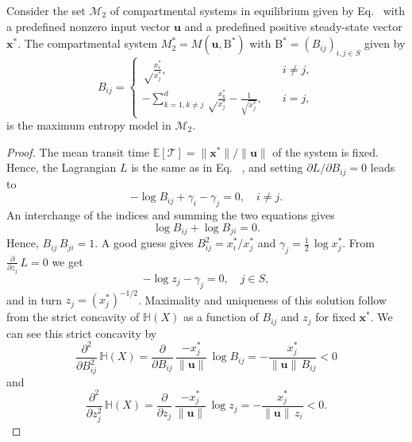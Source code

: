 \documentclass[smallextended]{svjour3}
\makeatletter
\renewcommand*{\eqref}[1]{%
  \hyperref[{#1}]{\textup{\tagform@{\ref*{#1}}}}%
}
\renewcommand{\tens}[1]{\mathrm{#1}}
\renewcommand{\vec}[1]{\mathbf{#1}}
\newcommand{\E}{\mathbb{E}}
\newcommand{\TT}{\mathcal{T}}
\renewcommand{\H}{\mathbb{H}}
\newcommand{\suml}{\sum\limits}
\newcommand{\pderiv}[1]{\frac{\partial}{\partial #1}}
\newcommand{\vnorms}[1]{\|#1\|}
\makeatother
\begin{document}
	\begin{myproposition}
    \label{proposition:max_ent_example_2}
		Consider the set $\mathcal{M}_2$ of compartmental systems in equilibrium given by Eq.~\eqref{eqn:lin_CS_sys} with a predefined nonzero input vector $\vec{u}$ and a predefined positive steady-state vector $\vec{x}^\ast$.
		The compartmental system $M^\ast_2=M(\vec{u},\tens{B}^\ast)$ with $\tens{B}^\ast=(B_{ij})_{i,j\in S}$ given by
		\begin{equation}
			B_{ij} = \begin{cases}
							\sqrt\frac{x_i^\ast}{x_j^\ast},\quad & i\neq j,\\
							-\suml_{k=1,k\neq j}^d \sqrt\frac{x_k^\ast}{x_j^\ast} - \frac{1}{\sqrt{x_j^\ast}}, \quad &i=j,
						\end{cases}
		\end{equation}
		is the maximum entropy model in $\mathcal{M}_2$.
	\end{myproposition}

	\begin{proof}
		The mean transit time $\E\left[\TT\right]=\vnorms{\vec{x}^\ast}/\vnorms{\vec{u}}$ of the system is fixed.
		Hence, the Lagrangian $L$ is the same as in Eq.~\eqref{eqn:Lagrangian}, and setting $\partial L / \partial B_{ij} = 0$ leads  to
		\begin{equation}
			-\log B_{ij} + \gamma_i-\gamma_j = 0,\quad i\neq j.
		\end{equation}
		An interchange of the indices and summing the two equations gives
		\begin{equation}
			\log B_{ij} + \log B_{ji} = 0.
		\end{equation}
		Hence, $B_{ij}\,B_{ji} = 1$.
		A good guess gives $B_{ij}^2 = x_i^\ast/x_j^\ast$ and $\gamma_j = \frac{1}{2}\,\log x_j^\ast$.
		From $\pderiv{z_j}\,L=0$ we get
		\begin{equation}
			-\log z_j -\gamma_j = 0,\quad j\in S,
		\end{equation}
		and in turn $z_j=(x_j^\ast)^{-1/2}$.
		Maximality and uniqueness of this solution follow from the strict concavity of $\H(X)$ as a function of $B_{ij}$ and $z_j$ for fixed $\vec{x}^\ast$.
		We can see this strict concavity by 
		\begin{equation}
			\frac{\partial^2}{\partial B_{ij}^2}\,\H(X) = \pderiv{B_{ij}}\,\frac{-x_j^\ast}{\vnorms{\vec{u}}}\,\log B_{ij} = -\frac{x_j^\ast}{\vnorms{\vec{u}}\,B_{ij}} < 0
		\end{equation}
		and
		\begin{equation}
			\frac{\partial^2}{\partial z_j^2}\,\H(X) = \pderiv{z_j}\,\frac{-x_j^\ast}{\vnorms{\vec{u}}}\,\log z_j = -\frac{x_j^\ast}{\vnorms{\vec{u}}\,z_i} < 0.
		\end{equation}
	\end{proof}
\end{document}
